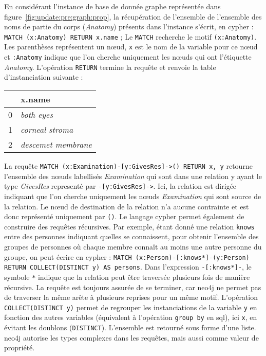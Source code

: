 \begin{example}
    En considérant l'instance de base de donnée graphe représentée dans figure~\ref{fig:update:pre:graph:prop}, la récupération de l'ensemble de l'ensemble des noms de partie du corps (\emph{Anatomy}) présents dans l'instance s'écrit, en \gls{cypher} : \verb|MATCH (x:Anatomy) RETURN x.name| ;
    Le \verb|MATCH| recherche le motif \verb|(x:Anatomy)|.
    Les parenthèses représentent un nœud, \verb|x| est le nom de la variable pour ce nœud et \verb|:Anatomy| indique que l'on cherche uniquement les nœuds qui ont l'étiquette \emph{Anatomy}.
    L'opération \verb|RETURN| termine la requête et renvoie la table d'instanciation suivante :

    \begin{center}
        \begin{tabular}{c|l}
              & x.name                   \\
            \hline
            0 & \emph{both eyes}         \\
            1 & \emph{corneal stroma}    \\
            2 & \emph{descemet membrane}
        \end{tabular}
    \end{center}

    La requête \verb|MATCH (x:Examination)-[y:GivesRes]->() RETURN x, y| retourne l'ensemble des nœuds labellisés \emph{Examination} qui sont dans une relation y ayant le type \emph{GivesRes} representé par \verb|-[y:GivesRes]->|.
    Ici, la relation est dirigée indiquant que l'on cherche uniquement les nœuds \emph{Examination} qui sont source de la relation.
    Le nœud de destination de la relation n'a aucune contrainte et est donc représenté uniquement par \verb|()|.
    Le langage \gls{cypher} permet également de construire des requêtes récursives.
    Par exemple, étant donné une relation \verb|knows| entre des personnes indiquant quelles se connaissent, pour obtenir l'ensemble des groupes de personnes où chaque membre connaît au moins une autre personne du groupe, on peut écrire en \gls{cypher} : \verb|MATCH (x:Person)-[:knows*]-(y:Person) RETURN COLLECT(DISTINCT y) AS persons|.
    Dans l'expression \verb|-[:knows*]-|, le symbole \verb|*| indique que la relation peut être traversée plusieurs fois de manière récursive.
    La requête est toujours assurée de se terminer, car \gls{neo4j} ne permet pas de traverser la même arête à plusieurs reprises pour un même motif.
    L'opération \verb|COLLECT(DISTINCT y)| permet de regrouper les instanciations de la variable \verb|y| en fonction des autres variables (équivalent à l'opération \verb|group by| en \gls{sql}), ici \verb|x|, en évitant les doublons (\verb|DISTINCT|).
    L'ensemble est retourné sous forme d'une liste.
    \gls{neo4j} autorise les types complexes dans les requêtes, mais aussi comme valeur de propriété.
\end{example}
